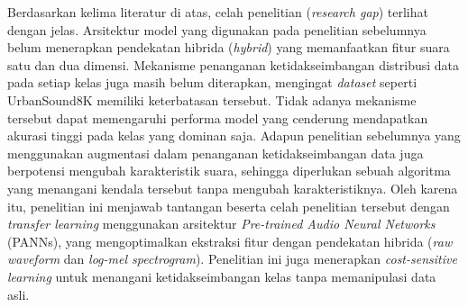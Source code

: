 Berdasarkan kelima literatur di atas, celah penelitian (\textit{research gap}) terlihat dengan jelas. 
Arsitektur model yang digunakan pada penelitian sebelumnya belum menerapkan pendekatan hibrida (\textit{hybrid}) yang memanfaatkan fitur suara satu dan dua dimensi.  
Mekanisme penanganan ketidakseimbangan distribusi data pada setiap kelas juga masih belum diterapkan, mengingat \textit{dataset} seperti UrbanSound8K memiliki keterbatasan tersebut. 
Tidak adanya mekanisme tersebut dapat memengaruhi performa model yang cenderung mendapatkan akurasi tinggi pada kelas yang dominan saja. 
Adapun penelitian sebelumnya yang menggunakan augmentasi dalam penanganan ketidakseimbangan data juga berpotensi mengubah karakteristik suara, sehingga diperlukan sebuah algoritma yang menangani kendala tersebut tanpa mengubah karakteristiknya. 
Oleh karena itu, penelitian ini menjawab tantangan beserta celah penelitian tersebut dengan \textit{transfer learning} menggunakan arsitektur \textit{Pre-trained Audio Neural Networks} (PANNs), yang mengoptimalkan ekstraksi fitur dengan pendekatan hibrida (\textit{raw waveform} dan \textit{log-mel spectrogram}).
Penelitian ini juga menerapkan \textit{cost-sensitive learning} untuk menangani ketidakseimbangan kelas tanpa memanipulasi data asli. \par

